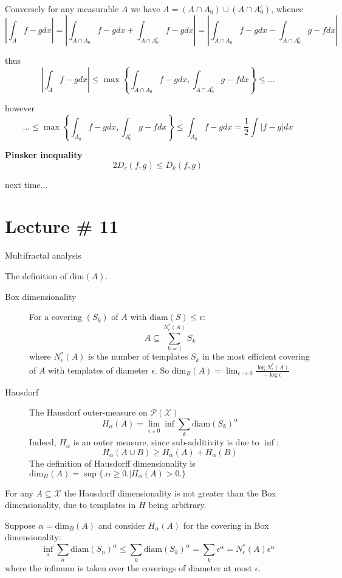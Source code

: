\documentclass[a4paper]{article}
\newcommand{\obj}[1]{{\left\{ #1 \right \}}}
\newcommand{\abs}[1]{{\left | #1 \right |}}
\newcommand{\Xcal}{\mathcal{X}}
\begin{document}
Conversely for any measurable $A$ we have $A = (A\cap A_0) \cup (A\cap A_0^c)$, whence
\[\abs{\int_A f-g dx} = \abs{\int_{A\cap A_0} f-g dx + \int_{A\cap A_0^c} f-g dx} = \abs{\int_{A\cap A_0} f-g dx - \int_{A\cap A_0^c} g-f dx}\]

thus 
\[\abs{\int_A f-g dx} \leq \max\obj{ \int_{A\cap A_0} f-g dx, \int_{A\cap A_0^c} g-f dx } \leq \ldots\]

however
\[\ldots \leq \max\obj{ \int_{A_0} f-g dx, \int_{A_0^c} g-f dx } \leq \int_{A_0} f-g dx  = \frac{1}{2}\int \abs{f-g} dx\]

\noindent\textbf{Pinsker inequality}\hfill \\
\[2 D_c(f,g) \leq D_k(f,g)\]

next time...



\section{Lecture \# 11} %
\label{sec:lecture_11}

Multifractal analysis

The definition of $\text{dim}(A)$.
\begin{description}
	\item[Box dimensionality] For a covering $(S_k)$ of $A$ with $\text{diam}(S)\leq \epsilon$:
	\[A \subseteq \sum_{k=1}^{N^*_\epsilon(A)} S_k \]
	where $N^*_\epsilon(A)$ is the number of templates $S_k$ in the most efficient covering of $A$ with templates of diameter $\epsilon$.
	So $\text{dim}_B(A) = \lim_{\epsilon \to 0} \frac{\log N^*_\epsilon(A)}{-\log \epsilon}$
	\item[Hausdorf] The Hausdorf outer-measure on $\mathcal{P}(\Xcal)$
	\[H_\alpha(A) = \lim_{\epsilon\downarrow 0} \inf \sum_k \text{diam}(S_k)^\alpha\]
	Indeed, $H_\alpha$ is an outer measure, since sub-additivity is due to $\inf$: \[H_\alpha(A\cup B) \geq H_\alpha(A)+H_\alpha(B)\]
	The definition of Hausdorff dimensionality is
	$\text{dim}_H(A) = \sup\big\{\big. \alpha\geq 0\big.\big\rvert H_\alpha(A) > 0 \big.\big\}$
\end{description}

For any $A\subseteq \Xcal$ the Hausdorff dimensionality is not greater than the Box dimensionality, due to templates in $H$ being arbitrary.

Suppose $\alpha = \text{dim}_B(A)$ and consider $H_\alpha(A)$ for the covering in Box dimensionality:
\[\inf_{*} \sum_n \text{diam}(S_n)^\alpha \leq \sum_k \text{diam}(S_k)^\alpha = \sum_k \epsilon^\alpha = N^*_\epsilon(A) \epsilon^\alpha\]
where the infimum is taken over the coverings of diameter at most $\epsilon$.
\end{document}
